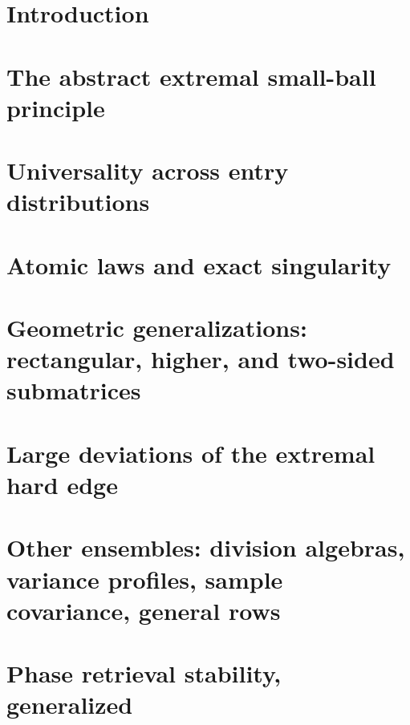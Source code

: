 \documentclass[11pt,reqno]{amsart}
\theoremstyle{plain}
\theoremstyle{definition}
\theoremstyle{remark}
\begin{document}
\tableofcontents

\section{Introduction}


\section{The abstract extremal small-ball principle}\label{sec:principle}


\section{Universality across entry distributions}\label{sec:universality}


\section{Atomic laws and exact singularity}\label{sec:atomic}


\section{Geometric generalizations: rectangular, higher, and two-sided submatrices}\label{sec:geometric}


\section{Large deviations of the extremal hard edge}\label{sec:ldp}


\section{Other ensembles: division algebras, variance profiles, sample covariance, general rows}\label{sec:ensembles}



\section{Phase retrieval stability, generalized}\label{sec:pr}

\end{document}
